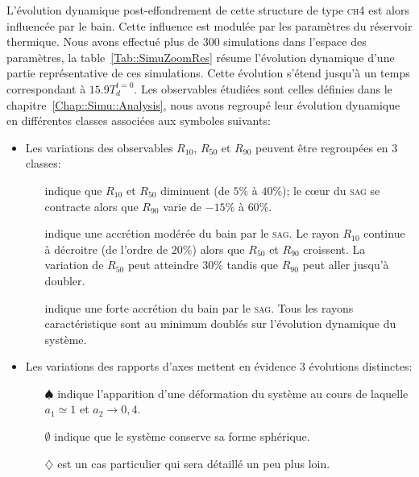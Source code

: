	L'évolution dynamique post-effondrement de cette structure de type \textsc{ch4} est alors influencée par le bain. Cette influence est modulée
	par les paramètres du réservoir thermique. Nous avons effectué plus de 300 simulations dans l'espace des paramètres, la
	table~\ref{Tab::SimuZoomRes} résume l'évolution dynamique d'une partie représentative de ces simulations. Cette évolution s'étend jusqu'à un
	temps correspondant à $15.9 T_d^{t=0}$.
	Les observables étudiées sont celles définies dans le chapitre~\ref{Chap::Simu::Analysis}, nous avons regroupé leur évolution dynamique en
	différentes classes associées aux symboles suivants:
	

	\begin{itemize}

		\item Les variations des observables $R_{10}$, $R_{50}$ et $R_{90}$ peuvent être regroupées en 3 classes:
			\begin{itemize}

				\item[\accretionpeu{}] indique que $R_{10}$ et $R_{50}$ diminuent (de $5\%$ à $40\%$); le cœur du \textsc{sag} se
					contracte alors que $R_{90}$ varie de $-15\%$ à $60\%$.

				\item[\accretionmoyen{}] indique une accrétion modérée du bain par le \textsc{sag}. Le rayon $R_{10}$ continue
					à décroitre (de l'ordre de $20\%$) alors que $R_{50}$ et $R_{90}$ croissent. La variation de $R_{50}$ peut
					atteindre $30\%$ tandis que $R_{90}$ peut aller jusqu'à doubler.

				\item[\accretionlot{}] indique une forte accrétion du bain par le \textsc{sag}. Tous les rayons caractéristique sont
					au minimum doublés sur l'évolution dynamique du système.
			\end{itemize}

		\item Les variations des rapports d'axes mettent en évidence 3 évolutions distinctes:
			\begin{itemize}

				\item[$\spadesuit$] indique l'apparition d'une déformation du système au cours de laquelle $a_1 \simeq 1$ et $a_2 \to 0,4$.

				\item[$\emptyset$] indique que le système conserve sa forme sphérique.

				\item[$\diamondsuit$] est un cas particulier qui sera détaillé un peu plus loin.

			\end{itemize}
	\end{itemize}

